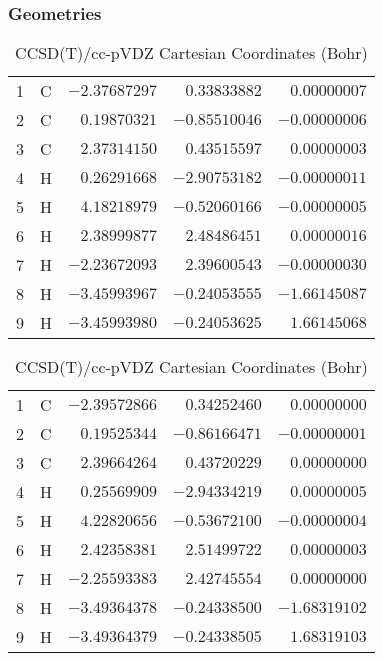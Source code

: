 \documentclass[10pt,oneside]{article}
\begin{document}
\begin{table}[h!]
\subsubsection*{Geometries}
\begin{multicols}{2}
\centering
\caption{CCSD(T)/cc-pVTZ Cartesian Coordinates (Bohr)}
\begin{tabular}{llrrr}
\toprule
1  & C  & $-2.37687297$ & $ 0.33833882$ & $ 0.00000007$ \\
2  & C  & $ 0.19870321$ & $-0.85510046$ & $-0.00000006$ \\
3  & C  & $ 2.37314150$ & $ 0.43515597$ & $ 0.00000003$ \\
4  & H  & $ 0.26291668$ & $-2.90753182$ & $-0.00000011$ \\
5  & H  & $ 4.18218979$ & $-0.52060166$ & $-0.00000005$ \\
6  & H  & $ 2.38999877$ & $ 2.48486451$ & $ 0.00000016$ \\
7  & H  & $-2.23672093$ & $ 2.39600543$ & $-0.00000030$ \\
8  & H  & $-3.45993967$ & $-0.24053555$ & $-1.66145087$ \\
9  & H  & $-3.45993980$ & $-0.24053625$ & $ 1.66145068$ \\
\bottomrule
\end{tabular}
\caption{CCSD(T)/cc-pVDZ Cartesian Coordinates (Bohr)}
\begin{tabular}{llrrr}
\toprule
1  & C  & $-2.39572866$ & $ 0.34252460$ & $ 0.00000000$ \\
2  & C  & $ 0.19525344$ & $-0.86166471$ & $-0.00000001$ \\
3  & C  & $ 2.39664264$ & $ 0.43720229$ & $ 0.00000000$ \\
4  & H  & $ 0.25569909$ & $-2.94334219$ & $ 0.00000005$ \\
5  & H  & $ 4.22820656$ & $-0.53672100$ & $-0.00000004$ \\
6  & H  & $ 2.42358381$ & $ 2.51499722$ & $ 0.00000003$ \\
7  & H  & $-2.25593383$ & $ 2.42745554$ & $ 0.00000000$ \\
8  & H  & $-3.49364378$ & $-0.24338500$ & $-1.68319102$ \\
9  & H  & $-3.49364379$ & $-0.24338505$ & $ 1.68319103$ \\
\bottomrule
\end{tabular}
\end{multicols}
\end{table}
\end{document}

